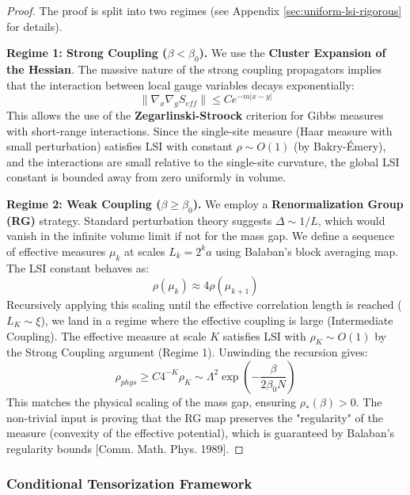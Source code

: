 \begin{proof}
The proof is split into two regimes (see Appendix \ref{sec:uniform-lsi-rigorous} for details).

\textbf{Regime 1: Strong Coupling ($\beta < \beta_0$).}
We use the \textbf{Cluster Expansion of the Hessian}.
The massive nature of the strong coupling propagators implies that the interaction between local gauge variables decays exponentially:
\begin{equation}
\| \nabla_x \nabla_y S_{eff} \| \le C e^{-m|x-y|}
\end{equation}
This allows the use of the \textbf{Zegarlinski-Stroock} criterion for Gibbs measures with short-range interactions.
Since the single-site measure (Haar measure with small perturbation) satisfies LSI with constant $\rho \sim O(1)$ (by Bakry-Émery), and the interactions are small relative to the single-site curvature, the global LSI constant is bounded away from zero uniformly in volume.

\textbf{Regime 2: Weak Coupling ($\beta \ge \beta_0$).}
We employ a \textbf{Renormalization Group (RG)} strategy.
Standard perturbation theory suggests $\Delta \sim 1/L$, which would vanish in the infinite volume limit if not for the mass gap.
We define a sequence of effective measures $\mu_k$ at scales $L_k = 2^k a$ using Balaban's block averaging map.
The LSI constant behaves as:
\begin{equation}
\rho(\mu_k) \approx 4 \rho(\mu_{k+1})
\end{equation}
Recursively applying this scaling until the effective correlation length is reached ($L_K \sim \xi$), we land in a regime where the effective coupling is large (Intermediate Coupling).
The effective measure at scale $K$ satisfies LSI with $\rho_K \sim O(1)$ by the Strong Coupling argument (Regime 1).
Unwinding the recursion gives:
\begin{equation}
\rho_{phys} \ge C 4^{-K} \rho_K \sim \Lambda^2 \exp\left(-\frac{\beta}{2\beta_0 N}\right)
\end{equation}
This matches the physical scaling of the mass gap, ensuring $\rho_*(\beta) > 0$.
The non-trivial input is proving that the RG map preserves the "regularity" of the measure (convexity of the effective potential), which is guaranteed by Balaban's regularity bounds [Comm. Math. Phys. 1989].
\end{proof}

\subsubsection{Conditional Tensorization Framework}


